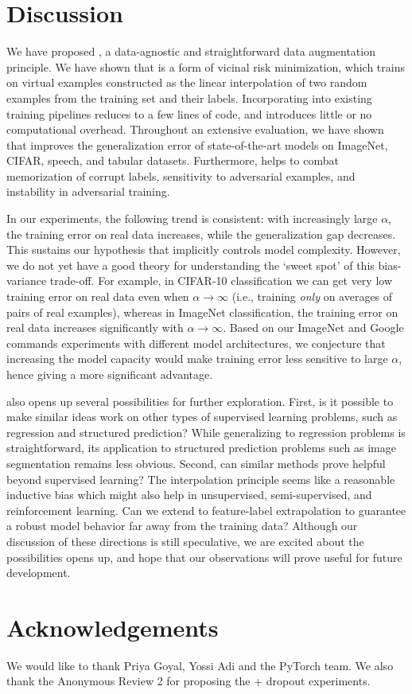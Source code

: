 \section{Discussion}
\label{sec:discussion}

We have proposed \mixup{}, a data-agnostic and straightforward data
augmentation principle.  We have shown that \mixup{} is a form of vicinal risk
minimization, which trains on virtual examples constructed as the linear
interpolation of two random examples from the training set and their labels.
Incorporating \mixup{} into existing training pipelines reduces to a few lines
of code, and introduces little or no computational overhead.  Throughout an
extensive evaluation, we have shown that \mixup{} improves the generalization
error of state-of-the-art models on ImageNet, CIFAR, speech, and tabular
datasets. Furthermore, \mixup{} helps to combat memorization of corrupt labels,
sensitivity to adversarial examples, and instability in adversarial training.

In our experiments, the following trend is consistent: with increasingly large
$\alpha$, the training error on real data increases, while the generalization
gap decreases. This sustains our hypothesis that \mixup{} implicitly controls
model complexity. However, we do not yet have a good theory for understanding
the `sweet spot' of this bias-variance trade-off. For example, in CIFAR-10
classification we can get very low training error on real data even when
$\alpha \to \infty$ (i.e., training \emph{only} on averages of pairs of real
examples), whereas in ImageNet classification, the training error on real data
increases significantly with $\alpha \to \infty$. Based on our ImageNet and
Google commands experiments with different model architectures, we conjecture
that increasing the model capacity would make training error less sensitive to
large $\alpha$, hence giving \mixup{} a more significant advantage. 

\mixup{} also opens up several possibilities for further exploration. First, is
it possible to make similar ideas work on other types of supervised learning
problems, such as regression and structured prediction? While generalizing
\mixup{} to regression problems is straightforward, its application to
structured prediction problems such as image segmentation remains less obvious.
Second, can similar methods prove helpful beyond supervised learning? The
interpolation principle seems like a reasonable inductive bias which might also
help in unsupervised, semi-supervised, and reinforcement learning. Can we
extend \mixup{} to feature-label extrapolation to guarantee a robust model
behavior far away from the training data? Although our discussion of these
directions is still speculative, we are excited about the possibilities
\mixup{} opens up, and hope that our observations will prove useful for future
development. 

\ificlrfinal
\section*{Acknowledgements}
We would like to thank Priya Goyal, Yossi Adi and the PyTorch team. We also thank the Anonymous Review 2 for proposing the \mixup{} + dropout experiments.
\fi
